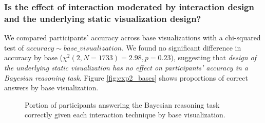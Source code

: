 \subsubsection{Is the effect of interaction moderated by interaction design and the underlying static visualization design?}
We compared participants' accuracy across base visualizations with a chi-squared test of $accuracy \sim base\_visualization$. We found no significant difference in accuracy by base ($\chi^2(2, N = 1733) = 2.98, p = 0.23$), suggesting that \textit{design of the underlying static visualization has no effect on participants' accuracy in a Bayesian reasoning task}. Figure \ref{fig:exp2_bases} shows proportions of correct answers by base visualization. 

\begin{figure}[h!]
    \centering
    \caption{Portion of participants answering the Bayesian reasoning task correctly given each interaction technique by base visualization.}
    \label{fig:exp2_interactions_by_base}
\end{figure}

